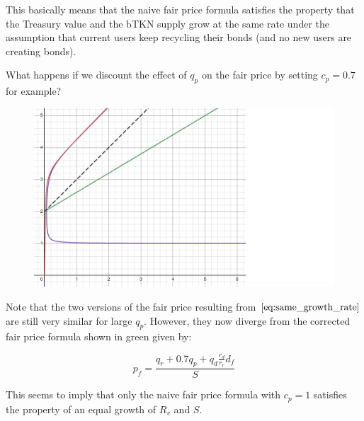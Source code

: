 \documentclass{article}
\begin{document}
This basically means that the naive fair price formula satisfies the property that the Treasury value and the bTKN supply grow at the same rate under the assumption that current users keep recycling their bonds (and no new users are creating bonds).

What happens if we discount the effect of $q_p$ on the fair price by setting $c_p=0.7$ for example?

\begin{figure}[h]
    \centering
    \includegraphics[width=0.5\linewidth]{./ChickenBonds_Whitepaper_growth_price_2.png}
\end{figure}

Note that the two versions of the fair price resulting from $\ref{eq:same_growth_rate}$ are still very similar for large $q_p$. However, they now diverge from the corrected fair price formula shown in green given by:

\begin{equation}
  \label{eq:corrected-naive}
   p_f = \frac{q_r + 0.7q_p + q_d \frac{r_d}{r_r} d_f}{S}
\end{equation}

This seems to imply that only the naive fair price formula with $c_p=1$ satisfies the property of an equal growth of $R_v$ and $S$. 





\end{document}
